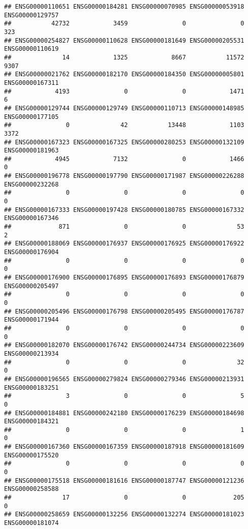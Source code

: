 \documentclass[
]{article}
\begin{document}
\begin{verbatim}
## ENSG00000110651 ENSG00000184281 ENSG00000070985 ENSG00000053918 ENSG00000129757 
##           42732            3459               0               0             323 
## ENSG00000254827 ENSG00000110628 ENSG00000181649 ENSG00000205531 ENSG00000110619 
##              14            1325            8667           11572            9307 
## ENSG00000021762 ENSG00000182170 ENSG00000184350 ENSG00000005801 ENSG00000167311 
##            4193               0               0            1471               6 
## ENSG00000129744 ENSG00000129749 ENSG00000110713 ENSG00000148985 ENSG00000177105 
##               0              42           13448            1103            3372 
## ENSG00000167323 ENSG00000167325 ENSG00000280253 ENSG00000132109 ENSG00000181963 
##            4945            7132               0            1466               0 
## ENSG00000196778 ENSG00000197790 ENSG00000171987 ENSG00000226288 ENSG00000232268 
##               0               0               0               0               0 
## ENSG00000167333 ENSG00000197428 ENSG00000180785 ENSG00000167332 ENSG00000167346 
##             871               0               0              53               2 
## ENSG00000188069 ENSG00000176937 ENSG00000176925 ENSG00000176922 ENSG00000176904 
##               0               0               0               0               0 
## ENSG00000176900 ENSG00000176895 ENSG00000176893 ENSG00000176879 ENSG00000205497 
##               0               0               0               0               0 
## ENSG00000205496 ENSG00000176798 ENSG00000205495 ENSG00000176787 ENSG00000171944 
##               0               0               0               0               0 
## ENSG00000182070 ENSG00000176742 ENSG00000244734 ENSG00000223609 ENSG00000213934 
##               0               0               0              32               0 
## ENSG00000196565 ENSG00000279824 ENSG00000279346 ENSG00000213931 ENSG00000183251 
##               3               0               0               5               0 
## ENSG00000184881 ENSG00000242180 ENSG00000176239 ENSG00000184698 ENSG00000184321 
##               0               0               0               1               0 
## ENSG00000167360 ENSG00000167359 ENSG00000187918 ENSG00000181609 ENSG00000175520 
##               0               0               0               0               0 
## ENSG00000175518 ENSG00000181616 ENSG00000187747 ENSG00000121236 ENSG00000258588 
##              17               0               0             205               0 
## ENSG00000258659 ENSG00000132256 ENSG00000132274 ENSG00000181023 ENSG00000181074 

\end{verbatim}
\end{document}
